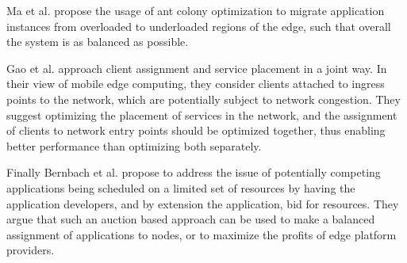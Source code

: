 Ma et al.\cite{maContainerMigrationMechanism2020} propose the usage of ant colony optimization to migrate application instances from overloaded to underloaded regions of the edge, such that overall the system is as balanced as possible.

Gao et al.\cite{gaoWinningStartingLine2019} approach client assignment and service placement in a joint way.
In their view of mobile edge computing, they consider clients attached to ingress points to the network, which are potentially subject to network congestion.
They suggest optimizing the placement of services in the network, and the assignment of clients to network entry points should be optimized together, thus enabling better performance than optimizing both separately.

Finally Bernbach et al.\cite{beraldiCooperativeLoadBalancing2017} propose to address the issue of potentially competing applications being scheduled on a limited set of resources by having the application developers, and by extension the application, bid for resources.
They argue that such an auction based approach can be used to make a balanced assignment of applications to nodes, or to maximize the profits of edge platform providers.

